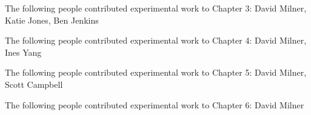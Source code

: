 \noindent The following people contributed experimental work to Chapter 3: David Milner, Katie Jones, Ben Jenkins

\noindent The following people contributed experimental work to Chapter 4: David Milner, Ines Yang

\noindent The following people contributed experimental work to Chapter 5: David Milner, Scott Campbell

\noindent The following people contributed experimental work to Chapter 6: David Milner 
